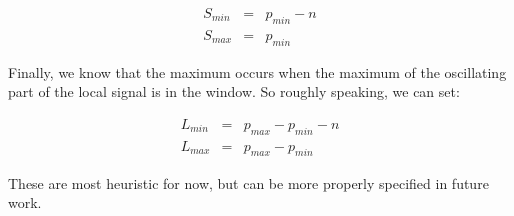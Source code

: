 \documentclass[11pt]{article}
\theoremstyle{plain}
\theoremstyle{definition}
\begin{document}
\begin{eqnarray}
	S_{min} &=& p_{min} - n \nonumber \\
	S_{max} &=& p_{min}
\end{eqnarray}

Finally, we know that the maximum occurs when the maximum of the oscillating part of the local signal is in the window. So roughly speaking, we can set:

\begin{eqnarray}
	L_{min} &=& p_{max} - p_{min} - n \nonumber \\
	L_{max} &=& p_{max} - p_{min} \nonumber 
\end{eqnarray}	

These are most heuristic for now, but can be more properly specified in future work. 





\end{document}
